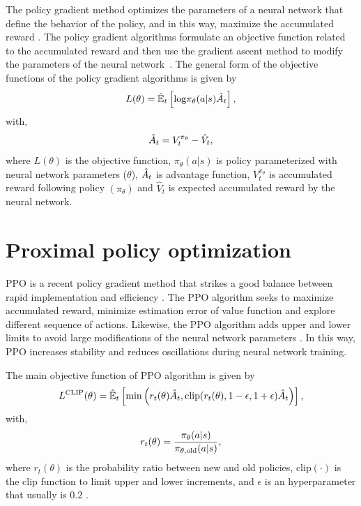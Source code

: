 The policy gradient method optimizes the parameters of a neural network that define the behavior of the policy, and in this way, maximize the accumulated reward \cite{sutton2018reinforcement}. The policy gradient algorithms formulate an objective function related to the accumulated reward and then use the gradient ascent method to modify the parameters of the neural network~\cite{thomas2017policy}. The general form of the objective functions of the policy gradient algorithms is given by
\begin{equation*}
	L(\theta) = \hat{\mathbb{E}}_{t} \left[ \mathrm{log} \pi_\theta (a|s) \hat{A}_{t}  \right],			
\end{equation*}
with,
\begin{equation*}
	\hat{A}_{t} = V^{\pi_{\theta}}_{t}  - \hat{V}_{t}, 
\end{equation*}
\noindent where $L(\theta)$ is the objective function, $\pi_\theta (a|s)$ is policy parameterized with neural network parameters ($\theta$), $\hat{A}_{t}$ is advantage function, $V^{\pi_{\theta}}_{t}$ is accumulated reward following policy $(\pi_\theta)$ and $\hat{V}_{t}$ is expected accumulated reward by the neural network.


\section{Proximal policy optimization}
PPO is a recent policy gradient method that strikes a good balance between rapid implementation and efficiency \cite{schulman2017proximal}. The PPO algorithm seeks to maximize accumulated reward, minimize estimation error of value function and explore different sequence of actions. Likewise, the PPO algorithm adds upper and lower limits to avoid large modifications of the neural network parameters \cite{schulman2017proximal}. In this way, PPO increases stability and reduces oscillations during neural network training.

The main objective function of PPO algorithm is given by
\begin{equation*}
	L^{\mathrm{CLIP}}(\theta) = \hat{\mathbb{E}}_{t} \left[ \mathrm{min} \left(  r_{t}(\theta)  \hat{A}_{t},  \mathrm{clip} (r_{t}(\theta) , 1-\epsilon, 1+\epsilon) \hat{A}_{t}  \right)  \right],	
\end{equation*}
with,
\begin{equation*}
	r_{t}(\theta) =\frac{\pi_{\theta}(a|s)}{\pi_{\theta, \mathrm{old}}(a|s) },			
\end{equation*}
\noindent where $r_{t}(\theta)$ is the probability ratio between new and old policies, $\mathrm{clip}(\cdot)$ is the clip function to limit upper and lower increments, and $\epsilon$ is an hyperparameter that usually is  $0.2$ \cite{schulman2017proximal}.


